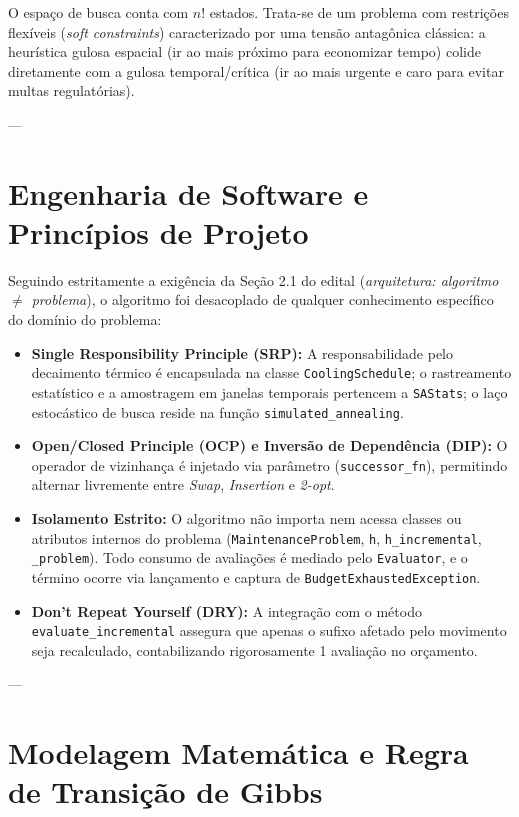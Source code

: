 \documentclass[11pt,a4paper]{article}
\begin{document}
O espaço de busca conta com $n!$ estados. Trata-se de um problema com restrições flexíveis (\textit{soft constraints}) caracterizado por uma tensão antagônica clássica: a heurística gulosa espacial (ir ao mais próximo para economizar tempo) colide diretamente com a gulosa temporal/crítica (ir ao mais urgente e caro para evitar multas regulatórias).

---

\section{Engenharia de Software e Princípios de Projeto}

Seguindo estritamente a exigência da Seção 2.1 do edital (\textit{arquitetura: algoritmo $\neq$ problema}), o algoritmo foi desacoplado de qualquer conhecimento específico do domínio do problema:
\begin{itemize}
    \item \textbf{Single Responsibility Principle (SRP):} A responsabilidade pelo decaimento térmico é encapsulada na classe \texttt{CoolingSchedule}; o rastreamento estatístico e a amostragem em janelas temporais pertencem a \texttt{SAStats}; o laço estocástico de busca reside na função \texttt{simulated\_annealing}.
    \item \textbf{Open/Closed Principle (OCP) e Inversão de Dependência (DIP):} O operador de vizinhança é injetado via parâmetro (\texttt{successor\_fn}), permitindo alternar livremente entre \textit{Swap}, \textit{Insertion} e \textit{2-opt}.
    \item \textbf{Isolamento Estrito:} O algoritmo não importa nem acessa classes ou atributos internos do problema (\texttt{MaintenanceProblem}, \texttt{h}, \texttt{h\_incremental}, \texttt{\_problem}). Todo consumo de avaliações é mediado pelo \texttt{Evaluator}, e o término ocorre via lançamento e captura de \texttt{BudgetExhaustedException}.
    \item \textbf{Don't Repeat Yourself (DRY):} A integração com o método \texttt{evaluate\_incremental} assegura que apenas o sufixo afetado pelo movimento seja recalculado, contabilizando rigorosamente 1 avaliação no orçamento.
\end{itemize}

---

\section{Modelagem Matemática e Regra de Transição de Gibbs}
\end{document}
